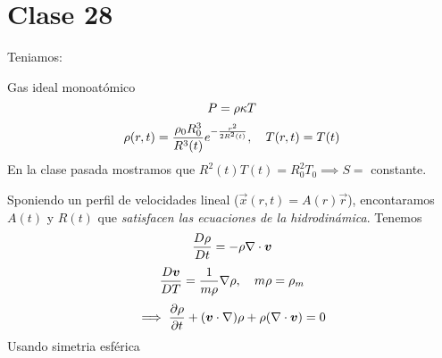 \section{Clase 28}
Teniamos:

Gas ideal monoatómico
\begin{equation}
  P=\rho\kappa T
\end{equation}
\begin{equation}
  \rho(r,t)=\frac{\rho_0R_0^3}{R^3(t)}e^{-\frac{r^2}{2R^2(t)}},\quad T(r,t)=T(t)
\end{equation}
En la clase pasada mostramos que $R^2(t)T(t)=R_0^2T_0\implies S=$ constante.

Sponiendo un perfil de velocidades lineal ($\vec{x}(r,t)=A(r)\vec{r}$), encontaramos $A(t)$ y $R(t)$ que \textit{satisfacen las ecuaciones de la hidrodinámica}. Tenemos
\begin{equation}
  \frac{D \rho }{D	t}=-\rho\nabla\cdot\vb*{v}
\end{equation}
\begin{equation}
  \frac{D\vb*{v}}{D T}=\frac{1}{m\rho }\nabla\rho ,\quad m\rho=\rho_m
\end{equation}
\begin{equation}
  \implies \pdv{\rho}{t}+(\vb*{v}\cdot\nabla)\rho +\rho (\nabla\cdot\vb*{v	})=0
\end{equation}
Usando simetria esférica


